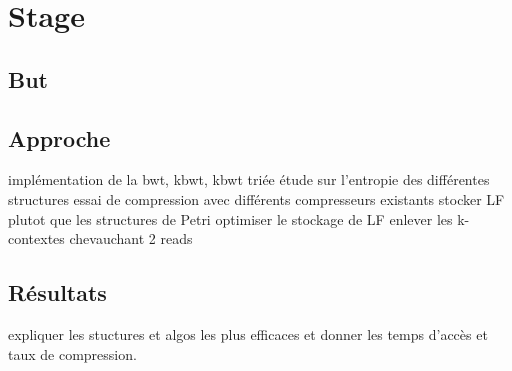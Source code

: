 \section{Stage}

\subsection{But}



\subsection{Approche}
	implémentation de la bwt, kbwt, kbwt triée
	étude sur l'entropie des différentes structures
	essai de compression avec différents compresseurs existants
	stocker LF plutot que les structures de Petri
	optimiser le stockage de LF
	enlever les k-contextes chevauchant 2 reads

\subsection{Résultats} 

expliquer les stuctures et algos les plus efficaces et donner les temps d'accès et taux de compression.
